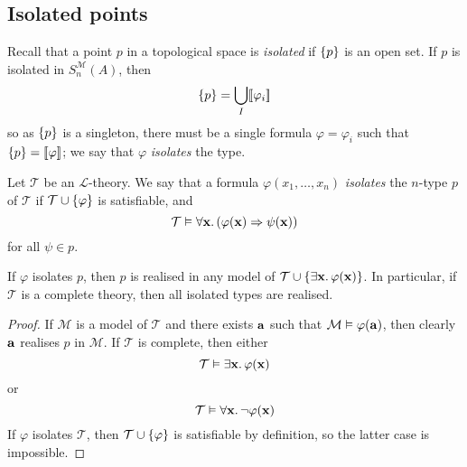 \subsection{Isolated points}
Recall that a point \( p \) in a topological space is \emph{isolated} if \( \qty{p} \) is an open set.
If \( p \) is isolated in \( S_n^{\mathcal M}(A) \), then
\[ \qty{p} = \bigcup_I [\![\varphi_i]\!] \]
so as \( \qty{p} \) is a singleton, there must be a single formula \( \varphi = \varphi_i \) such that \( \qty{p} = [\![\varphi]\!] \); we say that \( \varphi \) \emph{isolates} the type.
\begin{definition}
    Let \( \mathcal T \) be an \( \mathcal L \)-theory.
    We say that a formula \( \varphi(x_1, \dots, x_n) \) \emph{isolates} the \( n \)-type \( p \) of \( \mathcal T \) if \( \mathcal T \cup \qty{\varphi} \) is satisfiable, and
    \[ \mathcal T \vDash \forall \vb x.\, (\varphi(\vb x) \Rightarrow \psi(\vb x)) \]
    for all \( \psi \in p \).
\end{definition}
\begin{proposition}
    If \( \varphi \) isolates \( p \), then \( p \) is realised in any model of \( \mathcal T \cup \qty{\exists \vb x.\, \varphi(\vb x)} \).
    In particular, if \( \mathcal T \) is a complete theory, then all isolated types are realised.
\end{proposition}
\begin{proof}
    If \( \mathcal M \) is a model of \( \mathcal T \) and there exists \( \vb a \) such that \( \mathcal M \vDash \varphi(\vb a) \), then clearly \( \vb a \) realises \( p \) in \( \mathcal M \).
    If \( \mathcal T \) is complete, then either
    \[ \mathcal T \vDash \exists \vb x.\, \varphi(\vb x) \]
    or
    \[ \mathcal T \vDash \forall \vb x.\, \neg \varphi(\vb x) \]
    If \( \varphi \) isolates \( \mathcal T \), then \( \mathcal T \cup \qty{\varphi} \) is satisfiable by definition, so the latter case is impossible.
\end{proof}


